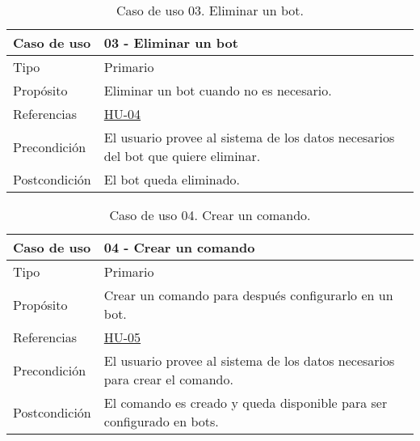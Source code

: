 \begin{table}[H]
    \centering
    \def\arraystretch{1.25}
    \begin{adjustbox}{max width=\textwidth}
    \begin{tabularx}{\textwidth}{|l|L|}
    \hline
        \textbf{Caso de uso} & \textbf{03 - Eliminar un bot} \\ \hline
    \hline
        Tipo & Primario \\ \hline
        Propósito & Eliminar un bot cuando no es necesario. \\ \hline
        Referencias & \hyperref[sec:hu04]{HU-04} \\ \hline
        Precondición & El usuario provee al sistema de los datos necesarios del bot que quiere eliminar. \\ \hline
        Postcondición & El bot queda eliminado. \\ \hline
    \end{tabularx}
    \end{adjustbox}
    \caption{Caso de uso 03. Eliminar un bot.}
\end{table}

\begin{table}[H]
    \centering
    \def\arraystretch{1.25}
    \begin{adjustbox}{max width=\textwidth}
    \begin{tabularx}{\textwidth}{|l|L|}
    \hline
        \textbf{Caso de uso} & \textbf{04 - Crear un comando} \\ \hline
    \hline
        Tipo & Primario \\ \hline
        Propósito & Crear un comando para después configurarlo en un bot. \\ \hline
        Referencias & \hyperref[sec:hu05]{HU-05} \\ \hline
        Precondición & El usuario provee al sistema de los datos necesarios para crear el comando. \\ \hline
        Postcondición & El comando es creado y queda disponible para ser configurado en bots. \\ \hline
    \end{tabularx}
    \end{adjustbox}
    \caption{Caso de uso 04. Crear un comando.}
\end{table}

